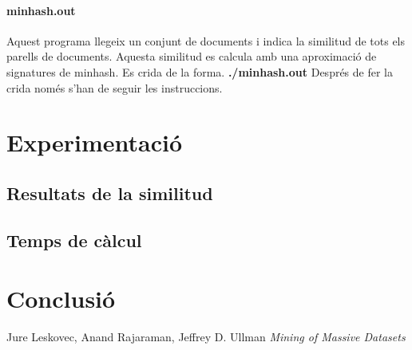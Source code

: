 \documentclass[a4paper, titlepage, 12pt]{report}
\begin{document}
\subsubsection{minhash.out}
Aquest programa llegeix un conjunt de documents i indica la similitud de tots els parells de documents. Aquesta similitud es calcula amb una aproximació de signatures de minhash. Es crida de la forma.
\textbf{./minhash.out}
Després de fer la crida només s'han de seguir les instruccions.


\chapter{Experimentació}
\section{Resultats de la similitud}

\section{Temps de càlcul}


\chapter{Conclusió}



\begin{thebibliography}{9}

	
Jure Leskovec, Anand Rajaraman, Jeffrey D. Ullman
\emph{Mining of Massive Datasets}


\end{thebibliography}

% 
\end{document}
